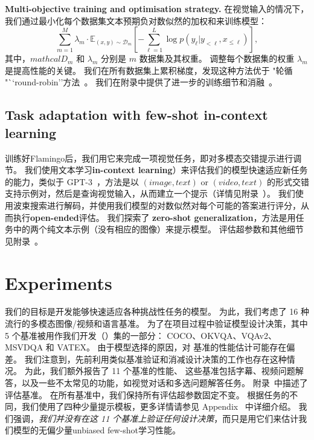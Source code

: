 \textbf{Multi-objective training and optimisation strategy.}
在视觉输入的情况下，我们通过最小化每个数据集文本预期负对数似然的加权和来训练模型：
\begin{equation}
    \sum_{m=1}^{M} \lambda_m \cdot \mathbb{E}_{(x, y)\sim \mathcal{D}_m} \left[ -\sum_{\ell=1}^L \log p(y_\ell | y_{< \ell}, x_{\leq \ell})\right],
\end{equation}
其中，$mathcal{D}_m$ 和 $\lambda_m$ 分别是 $m$ 数据集及其权重。
调整每个数据集的权重 $\lambda_m$ 是提高性能的关键。
我们在所有数据集上累积梯度，发现这种方法优于 "轮循 "``round-robin''方法~\citep{cho2021unifying}。
我们在附录中提供了进一步的训练细节和消融~。

\subsection{Task adaptation with few-shot in-context learning}
\label{sec:adapt-vlm}

训练好Flamingo后，我们用它来完成一项视觉任务，即对多模态交错提示进行调节。%
我们使用文本学习\textbf{in-context learning}）来评估我们的模型快速适应新任务的能力，类似于 GPT-3~\citep{gpt3}，方法是以 $(image, text)$ or $(video, text)$ 的形式交错支持示例对，然后是查询视觉输入，从而建立一个提示（详情见附录~）。
我们使用波束搜索进行解码，并使用我们模型的对数似然对每个可能的答案进行评分，从而执行\textbf{open-ended}评估。
我们探索了 \textbf{zero-shot generalization}，方法是用任务中的两个纯文本示例（没有相应的图像）来提示模型。
评估超参数和其他细节见附录~。



\section{Experiments}
\label{sec:experiments}
我们的目标是开发能够快速适应各种挑战性任务的模型。
为此，我们考虑了 16 种流行的多模态图像/视频和语言基准。
为了在项目过程中验证模型设计决策，其中 5 个基准被用作我们开发（\dev{}）集的一部分： COCO、OKVQA、VQAv2、MSVDQA 和 VATEX。
由于模型选择的原因，对 \dev{} 基准的性能估计可能存在偏差。
我们注意到，先前利用类似基准验证和消减设计决策的工作也存在这种情况。
为此，我们额外报告了 11 个基准的性能、
这些基准包括字幕、视频问题解答，以及一些不太常见的功能，如视觉对话和多选问题解答任务。
附录~中描述了评估基准。
在所有基准中，我们保持所有评估超参数固定不变。
根据任务的不同，我们使用了四种少量提示模板，更多详情请参见 
Appendix~ 中详细介绍。
我们强调，\emph{我们并没有在这 11 个基准上验证任何设计决策}，而只是用它们来估计我们模型的无偏少量unbiased few-shot学习性能。


